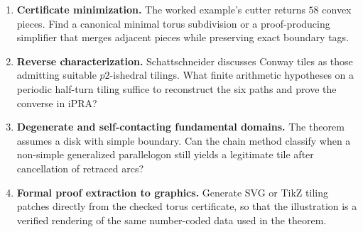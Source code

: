 \begin{enumerate}[label=\textbf{Q\arabic*.},leftmargin=*]
\item \textbf{Certificate minimization.}  The worked example's cutter returns \(58\) convex pieces.  Find a canonical minimal torus subdivision or a proof-producing simplifier that merges adjacent pieces while preserving exact boundary tags.

\item \textbf{Reverse characterization.}  Schattschneider discusses Conway tiles as those admitting suitable \(p2\)-ishedral tilings.  What finite arithmetic hypotheses on a periodic half-turn tiling suffice to reconstruct the six paths and prove the converse in iPRA?

\item \textbf{Degenerate and self-contacting fundamental domains.}  The theorem assumes a disk with simple boundary.  Can the chain method classify when a non-simple generalized parallelogon still yields a legitimate tile after cancellation of retraced arcs?

\item \textbf{Formal proof extraction to graphics.}  Generate SVG or TikZ tiling patches directly from the checked torus certificate, so that the illustration is a verified rendering of the same number-coded data used in the theorem.
\end{enumerate}
